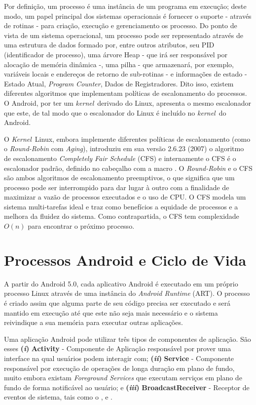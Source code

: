\documentclass[12pt, a4paper]{article}
\newcommand{\tit}[1]{\textit{#1}}
\newcommand{\tb}[1]{\textbf{#1}}
\newcommand{\bitem}[1]{\tb{(\tit{#1})}}
\newcommand{\kernel}{\tit{kernel}}
\newcommand{\Kernel}{\tit{Kernel}}
\begin{document}
    Por definição, um processo é uma instância de um programa em execução; deste modo, um papel principal dos sistemas operacionais é fornecer o suporte - através de rotinas - para criação, execução e gerenciamento os processo. Do ponto de vista de um sistema operacional, um processo pode ser representado através de uma estrutura de dados formado por, entre outros atributos, seu PID (identificador de processo), uma árvore Heap - que irá ser responsável por alocação de memória dinâmica -, uma pilha - que armazenará, por exemplo, variáveis locais e endereços de retorno de sub-rotinas - e informações de estado - Estado Atual, \tit{Program Counter}, Dados de Registradores.\cite{ArahamSilberschat2} Dito isso, existem diferentes algoritmos que implementam políticas de escalonamento do processos. O Android, por ter um \kernel \ derivado do Linux, apresenta o mesmo escalonador que este, de tal modo que o escalonador do Linux é incluído no \kernel \ do Android.\cite{android:sched_h}
    
    O \Kernel \ Linux, embora implemente diferentes políticas de escalonamento (como o \tit{Round-Robin} com \tit{Aging}), introduziu em sua versão 2.6.23 (2007) o algoritmo de escalonamento \tit{Completely Fair Schedule} (CFS) e internamente o CFS é o escalonador padrão, definido no cabeçalho com a macro .\cite{columbia:linux-sched, wiki:linux-kernel} O \tit{Round-Robin} e o CFS são ambos algoritmos de escalonamento preemptivos, o que significa que um processo pode ser interrompido para dar lugar à outro com a finalidade de maximizar a vazão de processos executados e o uso de CPU. O CFS modela um sistema multi-tarefas ideal e traz como benefícios a equidade de processos e a melhora da fluidez do sistema. Como contrapartida, o CFS tem complexidade $O(n)$ para encontrar o próximo processo.\cite{columbia:linux-sched}
    
    \section{Processos Android e Ciclo de Vida}
    A partir do Android 5.0, cada aplicativo Android é executado em um próprio processo Linux através de uma instância do \tit{Android Runtime} (ART). O processo é criado assim que alguma parte de seu código precisa ser executado e será mantido em execução até que este não seja mais necessário e o sistema reivindique a sua memória para executar outras aplicações.\cite{android:platform}
    
    Uma aplicação Android pode utilizar três tipos de componentes de aplicação. São esses \bitem{i} \tb{Activity} - Componente de Aplicação responsável por prover uma interface na qual usuários podem interagir com; \bitem{ii} \tb{Service} - Componente responsável por execução de operações de longa duração em plano de fundo, muito embora existam \tit{Foreground Services} que executam serviços em plano de fundo de forma notificável ao usuário; e \bitem{iii} \tb{BroadcastReceiver} - Receptor de eventos de sistema, tais como o ,  e .
    
\end{document}
